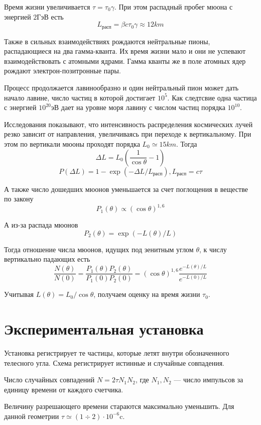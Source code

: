\documentclass[a4paper,12pt]{article}
\begin{document}
	Время жизни увеличивается $\tau = \tau_0 \gamma$. При этом распадный пробег мюона с энергией $2$ГэВ есть 
	$$L_{\text{расп}} = \beta c \tau_0 \gamma \approx 12km$$
	
	Также в сильных взаимодействиях рождаются нейтральные пионы, распадающиеся на два гамма-кванта. Их время жизни мало и они не успевают взаимодействовать с атомными ядрами. Гамма кванты же в поле атомных ядер рождают электрон-позитронные пары.
	
	Процесс продолжается лавинообразно и один нейтральный пион может дать начало лавине, число частиц в которой достигает $10^5$.  Как следтсвие одна частица с энергией $10^{20}$эВ дает на уровне моря лавину с числом частиц порядка $10^{10}.$
	
	Исследования показывают, что интенсивность распределения космических лучей резко зависит от направления, увеличиваясь при переходе к вертикальному. При этом по вертикали мюоны проходят порядка $L_0 \simeq 15km$. Тогда 
	$$\Delta L = L_0(\frac1{\cos \theta} - 1)$$
	$$P(\Delta L) = 1 - \exp(-\Delta L / L_\text{расп}), L_\text{расп} = c\tau$$
	
	А также число дошедших мюонов уменьшается за счет поглощения в веществе по закону
	$$P_1(\theta) \propto (\cos\theta)^{1,6}$$
	
	А из-за распада мюонов
	$$P_2(\theta) = \exp(-L(\theta)/L)$$
	
	Тогда отношение числа мюонов, идущих под зенитным углом $\theta$, к числу вертикально падающих есть
	$$\frac{N(\theta)}{N(0)} =  \frac{P_1(\theta)P_2(\theta)}{P_1(0)P_2(0)} = (\cos\theta)^{1,6} \frac{e^{-L(\theta)/L}}{e^{-L(0)/L}}$$
	
	Учитывая $L(\theta) = L_0 / \cos\theta$, получаем оценку на время жизни $\tau_0$.
		
	
	\section{Экспериментальная установка}
	
	
	
	Установка регистрирует те частицы, которые летят внутри обозначенного телесного угла. Схема регистрирует истинные и случайные совпадения.
	
	Число случайных совпадений $N = 2\tau N_1 N_2$, где $N_1, N_2$ --- число импульсов за единицу времени от каждого счетчика.
	
	Величину разрешающего времени стараются максимально уменьшить. Для данной геометрии $\tau \simeq (1\div 2) \cdot 10^{-6}$c.
	
\end{document}
